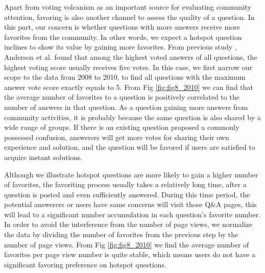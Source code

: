 Apart from voting volcanism as an important source for evaluating community attention, favoring is also another channel to assess the quality of a question. In this part, our concern is whether questions with more answers receive more favorites from the community. In other words, we expect a hotspot question inclines to show its value by gaining more favorites. From previous study \cite{anderson2012discovering}, Anderson et al. found that among the highest voted answers of all questions, the highest voting score usually receives five votes. In this case, we first narrow our scope to the data from 2008 to 2010, to find all questions with the maximum answer vote score exactly equals to 5. From Fig \ref{fig:fig8_2010} we can find that the average number of favorites to a question is positively correlated to the number of answers in that question. As a question gaining more answers from community activities, it is probably because the same question is also shared by a wide range of groups. If there is an existing question proposed a commonly possessed confusion, answerers will get more votes for sharing their own experience and solution, and the question will be favored if users are satisfied to acquire instant solutions. 

Although we illustrate hotspot questions are more likely to gain a higher number of favorites, the favoriting process usually takes a relatively long time, after a question is posted and even sufficiently answered. During this time period, the potential answerers or users have same concerns will visit those Q\&A pages, this will lead to a significant number accumulation in each question's favorite number. In order to avoid the interference from the number of page views, we normalize the data by dividing the number of favorites from the previous step by the number of page views. From Fig \ref{fig:fig8_2010} we find the average number of favorites per page view number is quite stable, which means users do not have a significant favoring preference on hotspot questions. 


